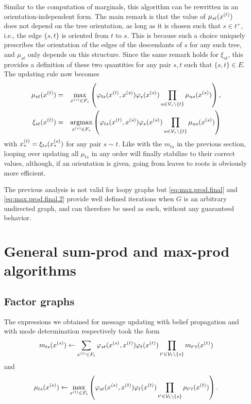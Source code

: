Similar to the computation of marginals, this
algorithm can be rewritten in an orientation-independent form. The main remark is that the value of $\mu_{st}(x^{(t)})$ does not depend on the  tree orientation, as long as it is chosen such that $s\in t^+$, i.e., the edge $\{s,t\}$ is oriented from $t$ to $s$. This is because such a choice uniquely prescribes the orientation of the edges of the descendants of $s$ for any such tree, and $\mu_{st}$ only depends on this structure. Since the same remark holds for $\xi_{st}$, this provides a definition of these two quantities for any pair $s,t$ such that $\{s,t\}\in E$. 
 The updating rule now
becomes
\begin{eqnarray}
\label{eq:max.prod.final}
\mu_{st}(x^{(t)}) &=& \max_{x^{(s)}\in F_s}\left(\varphi_{ts}(x^{(t)},x^{(s)})\varphi_s(x^{(s)}) \prod_{u\in {\mathcal V}_s\setminus \{t\}} \mu_{us}(x^{(s)})\right),\\
\label{eq:max.prod.final.2}
\xi_{st}(x^{(t)}) &=& \mathop{\mathrm{argmax}}_{x^{(s)}\in F_s}\left(\varphi_{ts}(x^{(t)},x^{(s)})\varphi_s(x^{(s)}) \prod_{u\in {\mathcal V}_s\setminus \{t\}} \mu_{us}(x^{(s)})\right)
\end{eqnarray}
with $x^{(t)}_* = \xi_{ts}(x^{(s)}_*)$ for any pair $s\sim t$.
Like with the $m_{ts}$ in the previous section, looping over updating
all $\mu_{ts}$ in
any order will finally stabilize to their correct values, although, if an orientation is given,
going from leaves to roots is obviously more efficient.

The previous analysis is not valid for loopy graphs but  \cref{eq:max.prod.final} and \cref{eq:max.prod.final.2}
provide well defined iterations when $G$ is an arbitrary undirected
graph, and can therefore be used as such, without any guaranteed behavior.

\section{General sum-prod and max-prod algorithms}
\subsection{Factor graphs}
The expressions we obtained for message updating with belief
propagation and with mode determination respectively took
the form
\[
m_{ts}(x^{(s)}) \leftarrow \sum_{x^{(t)}\in F_{t}} \varphi_{st}(x^{(s)}, x^{(t)}) \varphi_t(x^{(t)}) \prod_{t'\in{\mathcal V}_t\setminus \{s\}} m_{t't}(x^{(t)})
\]
and
$$
\mu_{ts}(x^{(s)}) \leftarrow \max_{x^{(t)}\in F_{t}}\left( \varphi_{st}(x^{(s)}, x^{(t)}) \varphi_t(x^{(t)}) \prod_{t'\in{\mathcal V}_t\setminus \{s\}} \mu_{t't}(x^{(t)})\right).
$$


